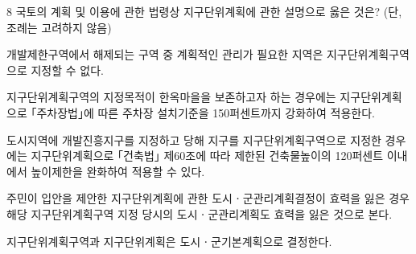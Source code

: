 \begin{question}{8}
국토의 계획 및 이용에 관한 법령상 지구단위계획에 관한 설명으로 옳은 것은? (단, 조례는 고려하지 않음)
\begin{choices}
  \item 개발제한구역에서 해제되는 구역 중 계획적인 관리가 필요한 지역은 지구단위계획구역으로 지정할 수 없다.
  \item 지구단위계획구역의 지정목적이 한옥마을을 보존하고자 하는 경우에는 지구단위계획으로 ｢주차장법｣에 따른 주차장 설치기준을 150퍼센트까지 강화하여 적용한다.
  \item 도시지역에 개발진흥지구를 지정하고 당해 지구를 지구단위계획구역으로 지정한 경우에는 지구단위계획으로 ｢건축법｣ 제60조에 따라 제한된 건축물높이의 120퍼센트 이내에서 높이제한을 완화하여 적용할 수 있다.
  \item 주민이 입안을 제안한 지구단위계획에 관한 도시ㆍ군관리계획결정이 효력을 잃은 경우 해당 지구단위계획구역 지정 당시의 도시ㆍ군관리계획도 효력을 잃은 것으로 본다.
  \item 지구단위계획구역과 지구단위계획은 도시ㆍ군기본계획으로 결정한다.
\end{choices}
\end{question}
